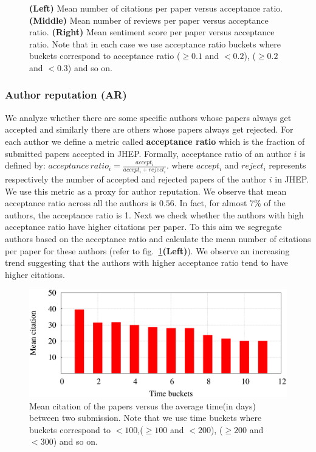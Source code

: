 \begin{figure}
\begin{tabular}{ccc}
\end{tabular}
\caption{{\bf (Left)} Mean number of citations per paper versus acceptance ratio. {\bf (Middle)} Mean number of reviews per paper versus acceptance ratio. {\bf (Right)} Mean sentiment score per paper versus acceptance ratio. Note that in each case we use acceptance ratio buckets where buckets correspond to acceptance ratio ($\geq 0.1$ and $< 0.2$), ($\geq 0.2$ and $<0.3$) and so on.}
\label{fig13}
\end{figure}
\subsubsection{Author reputation (AR)} We analyze whether there are some specific authors whose papers always get accepted and similarly there are others whose papers always get rejected.  
For each author we define a metric called {\bf acceptance ratio} which is the fraction of submitted papers accepted in JHEP. Formally, acceptance ratio of an author $i$ is defined by: $acceptance\,ratio_{i}=\frac{accept_{i}}{accept_{i} + reject_{i}}$.    
where $accept_{i}$ and $reject_{i}$ represents respectively the number of accepted and rejected papers of the author $i$ in JHEP. We use this metric as a proxy for author reputation.
We observe that mean acceptance ratio across all the authors is $0.56$. In fact, for almost 7\% of the authors, the acceptance ratio is 1. Next we check whether the authors with high acceptance ratio have higher citations per paper. To this aim we segregate authors based on the acceptance ratio and calculate the mean number of citations per paper for these authors (refer to fig.~\ref{fig13}{\bf (Left)}). We observe an increasing trend suggesting that the authors with higher acceptance ratio tend to have higher citations. 
\begin{figure}
\centering
\includegraphics[scale=0.25]{./texfiles/Chapter_4/jcdl/figures/prod_citation.eps}
\caption{Mean citation of the papers versus the average time(in days) between two submission. Note that  we use time buckets where buckets correspond to $<100$,($\geq 100$ and $< 200$), ($\geq 200$ and $<300$) and so on.\vspace{-2mm}}
\label{fig:prod}
\end{figure}

